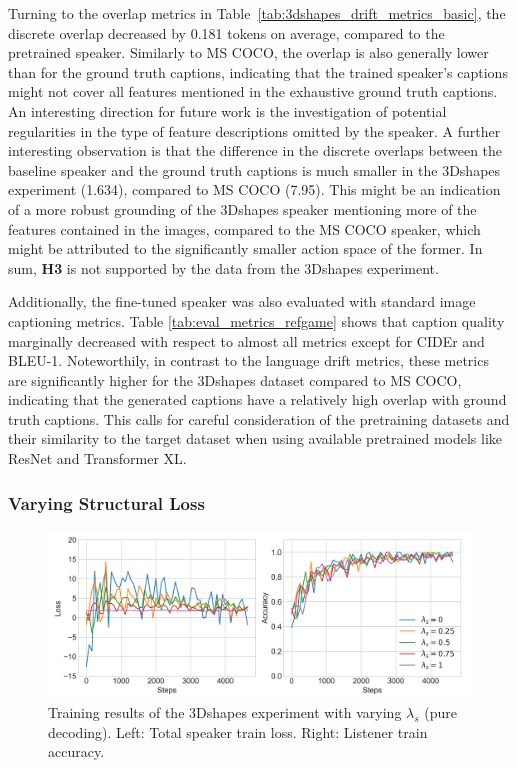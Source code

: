 Turning to the overlap metrics in Table~\ref{tab:3dshapes_drift_metrics_basic}, the discrete overlap decreased by 0.181 tokens on average, compared to the pretrained speaker. Similarly to MS COCO, the overlap is also generally lower than for the ground truth captions, indicating that the trained speaker's captions might not cover all features mentioned in the exhaustive ground truth captions. An interesting direction for future work is the investigation of potential regularities in the type of feature descriptions omitted by the speaker. A further interesting observation is that the difference in the discrete overlaps between the baseline speaker and the ground truth captions is much smaller in the 3Dshapes experiment (1.634), compared to MS COCO (7.95). This might be an indication of a more robust grounding of the 3Dshapes speaker mentioning more of the features contained in the images, compared to the MS COCO speaker, which might be attributed to the significantly smaller action space of the former. In sum, \textbf{H3} is not supported by the data from the 3Dshapes experiment.


Additionally, the fine-tuned speaker was also evaluated with standard image captioning metrics. Table \ref{tab:eval_metrics_refgame} shows that caption quality marginally decreased with respect to almost all metrics except for CIDEr and BLEU-1. Noteworthily, in contrast to the language drift metrics, these metrics are significantly higher for the 3Dshapes dataset compared to MS COCO, indicating that the generated captions have a relatively high overlap with ground truth captions. This calls for careful consideration of the pretraining datasets and their similarity to the target dataset when using available pretrained models like ResNet and Transformer XL.

\subsubsection{Varying Structural Loss}

\begin{figure}
	\centering
	\includegraphics[width=\linewidth]{images/shapes_refgame_49_pure_losses_all_Ls_random.png}
	\caption{Training results of the 3Dshapes experiment with varying $\lambda_s$ (pure decoding). Left: Total speaker train loss. Right: Listener train accuracy.}
	\label{fig:3dshapes_baseline_speaker_loss_listener_acc_all}
\end{figure}


